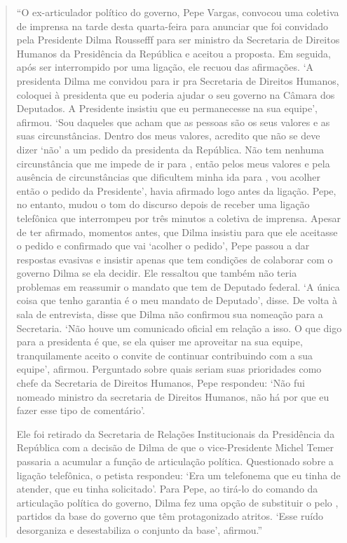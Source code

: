 \asterisc



\begin{quote}
``O ex-articulador político do governo, Pepe Vargas, convocou uma
coletiva de imprensa na tarde desta quarta-feira para anunciar que foi
convidado pela Presidente Dilma Roussefff para ser ministro da
Secretaria de Direitos Humanos da Presidência da República e aceitou a
proposta. Em seguida, após ser interrompido por uma ligação, ele recuou
das afirmações. `A presidenta Dilma me convidou para ir pra Secretaria
de Direitos Humanos, coloquei à presidenta que eu poderia ajudar o seu
governo na Câmara dos Deputados. A Presidente insistiu que eu
permanecesse na sua equipe', afirmou. `Sou daqueles que acham que as
pessoas são os seus valores e as suas circunstâncias. Dentro dos meus
valores, acredito que não se deve dizer `não' a um pedido da presidenta
da República. Não tem nenhuma circunstância que me impede de ir para
, então pelos meus valores e pela ausência de circunstâncias que
dificultem minha ida para , vou acolher então o pedido da
Presidente', havia afirmado logo antes da ligação. Pepe, no entanto,
mudou o tom do discurso depois de receber uma ligação telefônica que
interrompeu por três minutos a coletiva de imprensa. Apesar de ter
afirmado, momentos antes, que Dilma insistiu para que ele aceitasse o
pedido e confirmado que vai `acolher o pedido', Pepe passou a dar
respostas evasivas e insistir apenas que tem condições de colaborar com
o governo Dilma se ela decidir. Ele ressaltou que também não teria
problemas em reassumir o mandato que tem de Deputado federal. `A única
coisa que tenho garantia é o meu mandato de Deputado', disse. De volta à
sala de entrevista, disse que Dilma não confirmou sua nomeação para a
Secretaria. `Não houve um comunicado oficial em relação a isso. O que
digo para a presidenta é que, se ela quiser me aproveitar na sua equipe,
tranquilamente aceito o convite de continuar contribuindo com a sua
equipe', afirmou. Perguntado sobre quais seriam suas prioridades como
chefe da Secretaria de Direitos Humanos, Pepe respondeu: `Não fui
nomeado ministro da secretaria de Direitos Humanos, não há por que eu
fazer esse tipo de comentário'.

Ele foi retirado da Secretaria de
Relações Institucionais da Presidência da República com a decisão de
Dilma de que o vice-Presidente Michel Temer passaria a acumular a função
de articulação política. Questionado sobre a ligação telefônica, o
petista respondeu: `Era um telefonema que eu tinha de atender, que eu
tinha solicitado'. Para Pepe, ao tirá-lo do comando da articulação
política do governo, Dilma fez uma opção de substituir o  pelo ,
partidos da base do governo que têm protagonizado atritos. `Esse ruído
desorganiza e desestabiliza o conjunto da base', afirmou.''
\end{quote}


